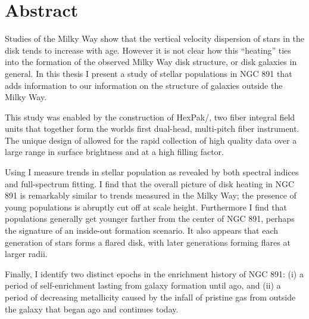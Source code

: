 \chapter*{Abstract}
\vspace{-0.5in}
Studies of the Milky Way show that the vertical velocity dispersion of
stars in the disk tends to increase with age. However it is not clear
how this ``heating'' ties into the formation of the observed Milky Way
disk structure, or disk galaxies in general. In this thesis I present
a study of stellar populations in NGC 891 that adds information to our
information on the structure of galaxies outside the Milky Way.

This study was enabled by the construction of HexPak/\GP, two fiber
integral field units that together form the worlds first dual-head,
multi-pitch fiber instrument. The unique design of \GP allowed for the
rapid collection of high quality data over a large range in surface
brightness and at a high filling factor.

Using \GP I measure trends in stellar population as revealed by both
spectral indices and full-spectrum fitting. I find that the overall
picture of disk heating in NGC 891 is remarkably similar to trends
measured in the Milky Way; the presence of young populations is
abruptly cut off at  scale height. Furthermore I find that
populations generally get younger farther from the center of NGC 891,
perhaps the signature of an inside-out formation scenario. It also
appears that each generation of stars forms a flared disk, with later
generations forming flares at larger radii.

Finally, I identify two distinct epochs in the enrichment history of
NGC 891: (i) a period of self-enrichment lasting from galaxy formation
until  ago, and (ii) a period of decreasing
metallicity caused by the infall of pristine gas from outside the
galaxy that began  ago and continues today.
